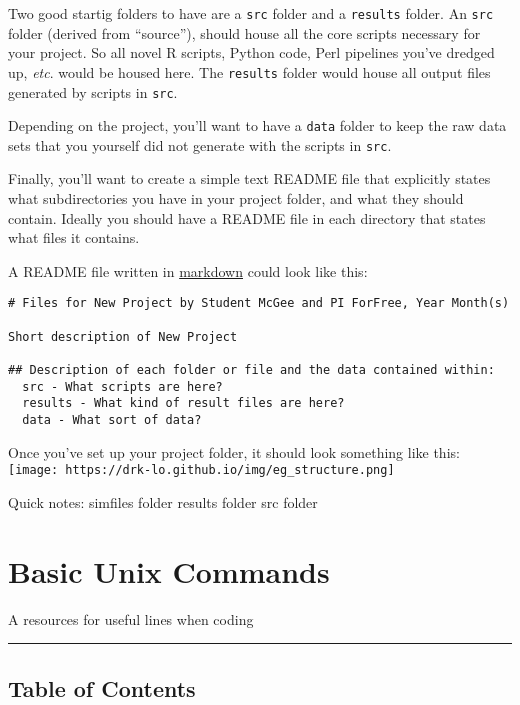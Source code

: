 \documentclass[
  letterpaper,
  DIV=11,
  numbers=noendperiod]{scrreprt}
\begin{document}
Two good startig folders to have are a \texttt{src} folder and a
\texttt{results} folder. An \texttt{src} folder (derived from
``source''), should house all the core scripts necessary for your
project. So all novel R scripts, Python code, Perl pipelines you've
dredged up, \emph{etc}. would be housed here. The \texttt{results}
folder would house all output files generated by scripts in
\texttt{src}.

Depending on the project, you'll want to have a \texttt{data} folder to
keep the raw data sets that you yourself did not generate with the
scripts in \texttt{src}.

Finally, you'll want to create a simple text README file that explicitly
states what subdirectories you have in your project folder, and what
they should contain. Ideally you should have a README file in each
directory that states what files it contains.

A README file written in
\href{https://www.markdownguide.org/cheat-sheet}{markdown} could look
like this:

\begin{verbatim}
# Files for New Project by Student McGee and PI ForFree, Year Month(s)

Short description of New Project

## Description of each folder or file and the data contained within:
  src - What scripts are here?
  results - What kind of result files are here?
  data - What sort of data?
\end{verbatim}

Once you've set up your project folder, it should look something like
this: \texttt{[image: https://drk-lo.github.io/img/eg\_structure.png]}

Quick notes: simfiles folder results folder src folder

\hypertarget{basic-unix-commands}{%
\chapter{Basic Unix Commands}\label{basic-unix-commands}}

A resources for useful lines when coding

\begin{center}\rule{0.5\linewidth}{0.5pt}\end{center}

\hypertarget{table-of-contents-1}{%
\section*{\texorpdfstring{\textbf{Table of
Contents}}{Table of Contents}}\label{table-of-contents-1}}
\end{document}
